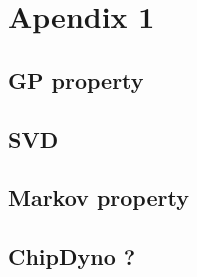 \chapter{Apendix 1} 

\section{ GP property}
\section{ SVD}
\section{ Markov property}
\section{ ChipDyno ?}
 

